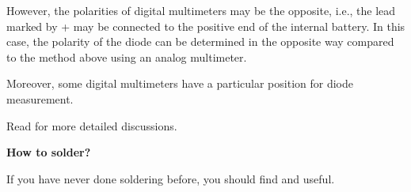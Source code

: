 However, the polarities of digital multimeters may be the opposite, i.e., the 
lead marked by + may be connected to the positive end of the internal battery.
In this case, the polarity of the diode can be determined in the opposite way
compared to the method above using an analog multimeter. 

Moreover, some digital multimeters have a particular position for diode measurement. 

Read 
for more detailed discussions.

{\bf How to solder?} 

If you have never done soldering before, you should find 
and 
useful.


  



	

	

